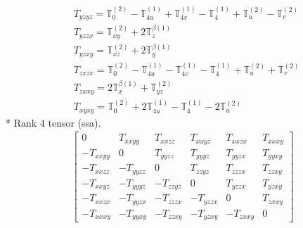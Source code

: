 \documentclass[fleqn,8pt,landscape]{jsarticle}
\begin{document}
\begin{align*}
& T_{yzyz} = \mathbb{T}_{0}^{(2)} - \mathbb{T}_{4u}^{(1)} + \mathbb{T}_{4v}^{(1)} - \mathbb{T}_{4}^{(1)} + \mathbb{T}_{u}^{(2)} - \mathbb{T}_{v}^{(2)} \\
& T_{yzzx} = \mathbb{T}_{xy}^{(2)} + 2 \mathbb{T}_{z}^{\beta(1)} \\
& T_{yzxy} = \mathbb{T}_{xz}^{(2)} + 2 \mathbb{T}_{y}^{\beta(1)} \\
& T_{zxzx} = \mathbb{T}_{0}^{(2)} - \mathbb{T}_{4u}^{(1)} - \mathbb{T}_{4v}^{(1)} - \mathbb{T}_{4}^{(1)} + \mathbb{T}_{u}^{(2)} + \mathbb{T}_{v}^{(2)} \\
& T_{zxxy} = 2 \mathbb{T}_{x}^{\beta(1)} + \mathbb{T}_{yz}^{(2)} \\
& T_{xyxy} = \mathbb{T}_{0}^{(2)} + 2 \mathbb{T}_{4u}^{(1)} - \mathbb{T}_{4}^{(1)} - 2 \mathbb{T}_{u}^{(2)}
\end{align*}
* Rank 4 tensor (ssa).
\begin{align*}
\begin{bmatrix} 0 & T_{xxyy} & T_{xxzz} & T_{xxyz} & T_{xxzx} & T_{xxxy} \\ - T_{xxyy} & 0 & T_{yyzz} & T_{yyyz} & T_{yyzx} & T_{yyxy} \\ - T_{xxzz} & - T_{yyzz} & 0 & T_{zzyz} & T_{zzzx} & T_{zzxy} \\ - T_{xxyz} & - T_{yyyz} & - T_{zzyz} & 0 & T_{yzzx} & T_{yzxy} \\ - T_{xxzx} & - T_{yyzx} & - T_{zzzx} & - T_{yzzx} & 0 & T_{zxxy} \\ - T_{xxxy} & - T_{yyxy} & - T_{zzxy} & - T_{yzxy} & - T_{zxxy} & 0 \end{bmatrix}
\end{align*}
\end{document}
